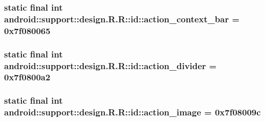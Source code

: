 \hypertarget{classandroid_1_1support_1_1design_1_1_r_1_1id_6fac0bfa3f60b60afed63cda2ffbd2da}{
\subsubsection[{action\_\-context\_\-bar}]{\setlength{\rightskip}{0pt plus 5cm}static final int android::support::design.R.R::id::action\_\-context\_\-bar = 0x7f080065}}
\label{classandroid_1_1support_1_1design_1_1_r_1_1id_6fac0bfa3f60b60afed63cda2ffbd2da}


\hypertarget{classandroid_1_1support_1_1design_1_1_r_1_1id_2ed439f1df038be28e1439e83c42ed05}{
\subsubsection[{action\_\-divider}]{\setlength{\rightskip}{0pt plus 5cm}static final int android::support::design.R.R::id::action\_\-divider = 0x7f0800a2}}
\label{classandroid_1_1support_1_1design_1_1_r_1_1id_2ed439f1df038be28e1439e83c42ed05}


\hypertarget{classandroid_1_1support_1_1design_1_1_r_1_1id_1d2bacf6479443bfbad8ea99963c12a3}{
\subsubsection[{action\_\-image}]{\setlength{\rightskip}{0pt plus 5cm}static final int android::support::design.R.R::id::action\_\-image = 0x7f08009c}}
\label{classandroid_1_1support_1_1design_1_1_r_1_1id_1d2bacf6479443bfbad8ea99963c12a3}


